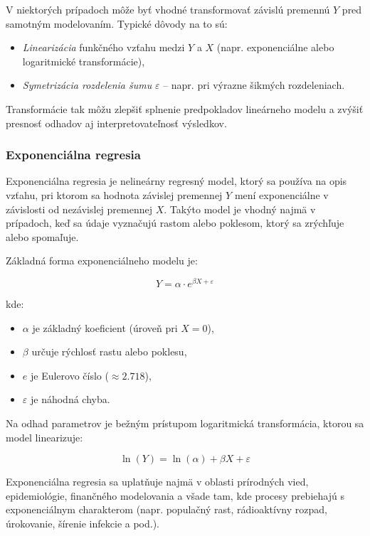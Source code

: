 V niektorých prípadoch môže byť vhodné transformovať závislú premennú $Y$ pred samotným modelovaním. Typické dôvody na to sú:

\begin{itemize}
  \item \textit{Linearizácia} funkčného vzťahu medzi $Y$ a $X$ (napr. exponenciálne alebo logaritmické transformácie),
  \item \textit{Symetrizácia rozdelenia šumu} $\varepsilon$ – napr. pri výrazne šikmých rozdeleniach.
\end{itemize}
Transformácie tak môžu zlepšiť splnenie predpokladov lineárneho modelu a zvýšiť presnosť odhadov aj interpretovateľnosť výsledkov.

\subsubsection{Exponenciálna regresia}
\label{subsec:exponential_regression}

Exponenciálna regresia je nelineárny regresný model, ktorý sa používa na opis vzťahu, pri ktorom sa hodnota závislej premennej $Y$ mení exponenciálne v závislosti od nezávislej premennej $X$. Takýto model je vhodný najmä v prípadoch, keď sa údaje vyznačujú rastom alebo poklesom, ktorý sa zrýchľuje alebo spomaľuje.

Základná forma exponenciálneho modelu je:

\begin{equation}
Y = \alpha \cdot e^{\beta X+\varepsilon}
\end{equation}

kde:
\begin{itemize}
  \item $\alpha$ je základný koeficient (úroveň pri $X=0$),
  \item $\beta$ určuje rýchlosť rastu alebo poklesu,
  \item $e$ je Eulerovo číslo ($\approx 2.718$),
  \item $\varepsilon$ je náhodná chyba.
\end{itemize}

Na odhad parametrov je bežným prístupom logaritmická transformácia, ktorou sa model linearizuje:

\begin{equation}
\ln(Y) = \ln(\alpha) + \beta X + \varepsilon
\end{equation}

Exponenciálna regresia sa uplatňuje najmä v oblasti prírodných vied, epidemiológie, finančného modelovania a všade tam, kde procesy prebiehajú s exponenciálnym charakterom (napr. populačný rast, rádioaktívny rozpad, úrokovanie, šírenie infekcie a pod.).

